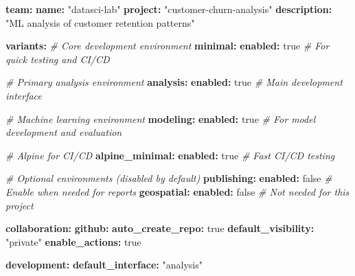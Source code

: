 \documentclass[
]{article}
\newenvironment{Shaded}{\begin{snugshade}}{\end{snugshade}}
\newcommand{\AttributeTok}[1]{\textcolor[rgb]{0.13,0.29,0.53}{#1}}
\newcommand{\CharTok}[1]{\textcolor[rgb]{0.31,0.60,0.02}{#1}}
\newcommand{\CommentTok}[1]{\textcolor[rgb]{0.56,0.35,0.01}{\textit{#1}}}
\newcommand{\FunctionTok}[1]{\textcolor[rgb]{0.13,0.29,0.53}{\textbf{#1}}}
\newcommand{\KeywordTok}[1]{\textcolor[rgb]{0.13,0.29,0.53}{\textbf{#1}}}
\newcommand{\StringTok}[1]{\textcolor[rgb]{0.31,0.60,0.02}{#1}}
\begin{document}
\begin{Shaded}
\begin{Highlighting}[]
\FunctionTok{team}\KeywordTok{:}
\AttributeTok{  }\FunctionTok{name}\KeywordTok{:}\AttributeTok{ }\StringTok{"datasci{-}lab"}
\AttributeTok{  }\FunctionTok{project}\KeywordTok{:}\AttributeTok{ }\StringTok{"customer{-}churn{-}analysis"}
\AttributeTok{  }\FunctionTok{description}\KeywordTok{:}\AttributeTok{ }\StringTok{"ML analysis of customer retention patterns"}

\FunctionTok{variants}\KeywordTok{:}
\CommentTok{  \# Core development environment}
\AttributeTok{  }\FunctionTok{minimal}\KeywordTok{:}
\AttributeTok{    }\FunctionTok{enabled}\KeywordTok{:}\AttributeTok{ }\CharTok{true}\CommentTok{    \# For quick testing and CI/CD}

\CommentTok{  \# Primary analysis environment}
\AttributeTok{  }\FunctionTok{analysis}\KeywordTok{:}
\AttributeTok{    }\FunctionTok{enabled}\KeywordTok{:}\AttributeTok{ }\CharTok{true}\CommentTok{    \# Main development interface}

\CommentTok{  \# Machine learning environment}
\AttributeTok{  }\FunctionTok{modeling}\KeywordTok{:}
\AttributeTok{    }\FunctionTok{enabled}\KeywordTok{:}\AttributeTok{ }\CharTok{true}\CommentTok{    \# For model development and evaluation}

\CommentTok{  \# Alpine for CI/CD}
\AttributeTok{  }\FunctionTok{alpine\_minimal}\KeywordTok{:}
\AttributeTok{    }\FunctionTok{enabled}\KeywordTok{:}\AttributeTok{ }\CharTok{true}\CommentTok{    \# Fast CI/CD testing}

\CommentTok{  \# Optional environments (disabled by default)}
\AttributeTok{  }\FunctionTok{publishing}\KeywordTok{:}
\AttributeTok{    }\FunctionTok{enabled}\KeywordTok{:}\AttributeTok{ }\CharTok{false}\CommentTok{   \# Enable when needed for reports}
\AttributeTok{  }\FunctionTok{geospatial}\KeywordTok{:}
\AttributeTok{    }\FunctionTok{enabled}\KeywordTok{:}\AttributeTok{ }\CharTok{false}\CommentTok{   \# Not needed for this project}

\FunctionTok{collaboration}\KeywordTok{:}
\AttributeTok{  }\FunctionTok{github}\KeywordTok{:}
\AttributeTok{    }\FunctionTok{auto\_create\_repo}\KeywordTok{:}\AttributeTok{ }\CharTok{true}
\AttributeTok{    }\FunctionTok{default\_visibility}\KeywordTok{:}\AttributeTok{ }\StringTok{"private"}
\AttributeTok{    }\FunctionTok{enable\_actions}\KeywordTok{:}\AttributeTok{ }\CharTok{true}

\AttributeTok{  }\FunctionTok{development}\KeywordTok{:}
\AttributeTok{    }\FunctionTok{default\_interface}\KeywordTok{:}\AttributeTok{ }\StringTok{"analysis"}
\end{Highlighting}
\end{Shaded}
\end{document}
